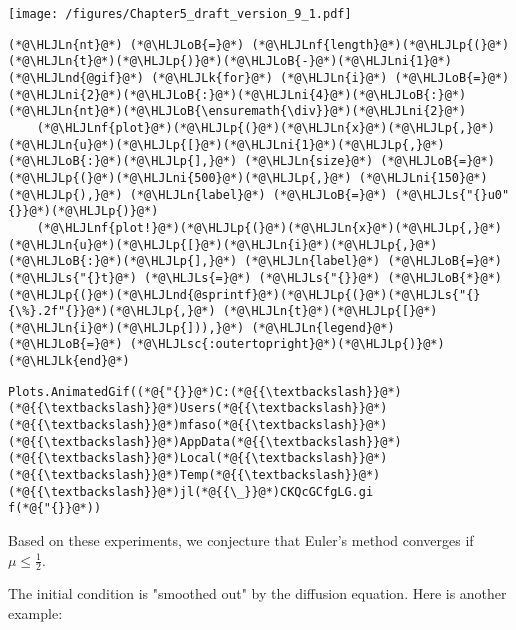 \documentclass[12pt,a4paper]{article}
\newcommand{\HLJLk}[1]{\textcolor[RGB]{148,91,176}{\textbf{#1}}}
\newcommand{\HLJLn}[1]{#1}
\newcommand{\HLJLnd}[1]{\textcolor[RGB]{214,102,97}{#1}}
\newcommand{\HLJLnf}[1]{\textcolor[RGB]{66,102,213}{#1}}
\newcommand{\HLJLs}[1]{\textcolor[RGB]{201,61,57}{#1}}
\newcommand{\HLJLsc}[1]{\textcolor[RGB]{201,61,57}{#1}}
\newcommand{\HLJLni}[1]{\textcolor[RGB]{59,151,46}{#1}}
\newcommand{\HLJLoB}[1]{\textcolor[RGB]{102,102,102}{\textbf{#1}}}
\newcommand{\HLJLp}[1]{#1}
\begin{document}
\texttt{[image: /figures/Chapter5\_draft\_version\_9\_1.pdf]}

\begin{lstlisting}
(*@\HLJLn{nt}@*) (*@\HLJLoB{=}@*) (*@\HLJLnf{length}@*)(*@\HLJLp{(}@*)(*@\HLJLn{t}@*)(*@\HLJLp{)}@*)(*@\HLJLoB{-}@*)(*@\HLJLni{1}@*)
(*@\HLJLnd{@gif}@*) (*@\HLJLk{for}@*) (*@\HLJLn{i}@*) (*@\HLJLoB{=}@*) (*@\HLJLni{2}@*)(*@\HLJLoB{:}@*)(*@\HLJLni{4}@*)(*@\HLJLoB{:}@*)(*@\HLJLn{nt}@*)(*@\HLJLoB{\ensuremath{\div}}@*)(*@\HLJLni{2}@*) 
    (*@\HLJLnf{plot}@*)(*@\HLJLp{(}@*)(*@\HLJLn{x}@*)(*@\HLJLp{,}@*) (*@\HLJLn{u}@*)(*@\HLJLp{[}@*)(*@\HLJLni{1}@*)(*@\HLJLp{,}@*)(*@\HLJLoB{:}@*)(*@\HLJLp{],}@*) (*@\HLJLn{size}@*) (*@\HLJLoB{=}@*) (*@\HLJLp{(}@*)(*@\HLJLni{500}@*)(*@\HLJLp{,}@*) (*@\HLJLni{150}@*)(*@\HLJLp{),}@*) (*@\HLJLn{label}@*) (*@\HLJLoB{=}@*) (*@\HLJLs{"{}u0"{}}@*)(*@\HLJLp{)}@*)
    (*@\HLJLnf{plot!}@*)(*@\HLJLp{(}@*)(*@\HLJLn{x}@*)(*@\HLJLp{,}@*) (*@\HLJLn{u}@*)(*@\HLJLp{[}@*)(*@\HLJLn{i}@*)(*@\HLJLp{,}@*)(*@\HLJLoB{:}@*)(*@\HLJLp{],}@*) (*@\HLJLn{label}@*) (*@\HLJLoB{=}@*) (*@\HLJLs{"{}t}@*) (*@\HLJLs{=}@*) (*@\HLJLs{"{}}@*) (*@\HLJLoB{*}@*) (*@\HLJLp{(}@*)(*@\HLJLnd{@sprintf}@*)(*@\HLJLp{(}@*)(*@\HLJLs{"{}{\%}.2f"{}}@*)(*@\HLJLp{,}@*) (*@\HLJLn{t}@*)(*@\HLJLp{[}@*)(*@\HLJLn{i}@*)(*@\HLJLp{])),}@*) (*@\HLJLn{legend}@*) (*@\HLJLoB{=}@*) (*@\HLJLsc{:outertopright}@*)(*@\HLJLp{)}@*)
(*@\HLJLk{end}@*)
\end{lstlisting}

\begin{lstlisting}
Plots.AnimatedGif((*@{"{}}@*)C:(*@{{\textbackslash}}@*)(*@{{\textbackslash}}@*)Users(*@{{\textbackslash}}@*)(*@{{\textbackslash}}@*)mfaso(*@{{\textbackslash}}@*)(*@{{\textbackslash}}@*)AppData(*@{{\textbackslash}}@*)(*@{{\textbackslash}}@*)Local(*@{{\textbackslash}}@*)(*@{{\textbackslash}}@*)Temp(*@{{\textbackslash}}@*)(*@{{\textbackslash}}@*)jl(*@{{\_}}@*)CKQcGCfgLG.gi
f(*@{"{}}@*))
\end{lstlisting}


Based on these experiments, we conjecture that Euler's method converges if $\mu \leq \frac{1}{2}$.

The initial condition is "smoothed out" by the diffusion equation.  Here is another example:
\end{document}
